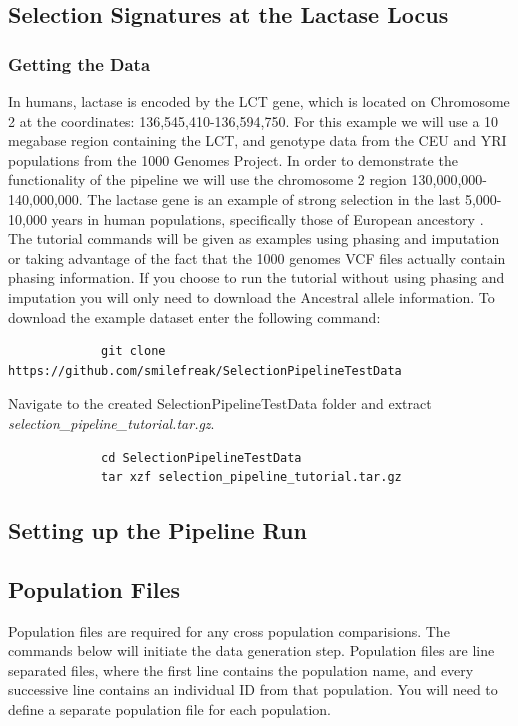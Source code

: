 \documentclass[a4paper,10pt]{article}
\begin{document}
             \subsection{Selection Signatures at the Lactase Locus}
             \subsubsection{Getting the Data}
             In humans, lactase is encoded by the LCT gene, which is located on
             Chromosome 2 at the coordinates:
             136,545,410-136,594,750. For this example we will use a 10
             megabase region containing the LCT, and genotype data from the CEU and YRI
             populations from the 1000 Genomes Project. In order to demonstrate the
             functionality of the pipeline we will use the chromosome 2 region
             130,000,000-140,000,000. The lactase gene is an example of strong selection in
             the last 5,000-10,000 years in human populations, specifically
             those of European ancestory \citep{lactase2004}. The tutorial commands will be given as examples using phasing and imputation or taking advantage of the fact that the 1000 genomes VCF files actually contain phasing information. If you choose to run the tutorial without using phasing and imputation you will only need to download the Ancestral allele information.
             To download the example dataset enter the following command:

             {\small
             \begin{verbatim}
             git clone https://github.com/smilefreak/SelectionPipelineTestData
             \end{verbatim}
             }

             \noindent
             Navigate to the created SelectionPipelineTestData folder and extract \emph{selection\_pipeline\_tutorial.tar.gz}. 

             \begin{verbatim}
             cd SelectionPipelineTestData
             tar xzf selection_pipeline_tutorial.tar.gz
             \end{verbatim}

             \subsection{Setting up the Pipeline Run}
             \subsection{Population Files}
             Population files are required for any cross population
             comparisions. The commands below will initiate the data generation
             step. Population files are line separated files, where the first line
             contains the population name, and every successive line contains an
             individual ID from that population. You will need to define a separate
             population file for each population.\\
\end{document}
